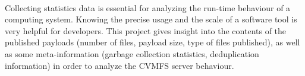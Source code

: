 \paragraph{}Collecting statistics data is essential for analyzing the run-time behaviour of a computing system. Knowing the precise usage and the scale of a software tool is very helpful for developers. This project gives insight into the contents of the published payloads (number of files, payload size, type of files published), as well as some meta-information (garbage collection statistics, deduplication information) in order to analyze the CVMFS server behaviour.
